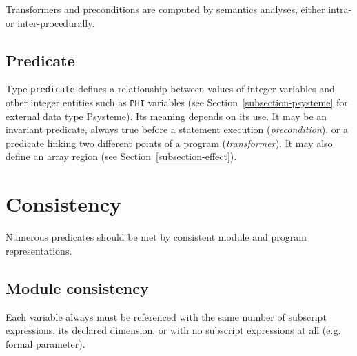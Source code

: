 \documentclass[a4paper]{article}
\begin{document}
Transformers and preconditions are computed by semantics analyses,
either intra- or inter-procedurally.

\begin{comment}
Les transformers ne sont d�finis qu'apr�s une phase d'analyse s�mantique.
\end{comment}

\subsection{Predicate}
\label{subsection-predicate}

{}

Type \verb/predicate/ defines a relationship between values of integer
variables and other integer entities such as \verb/PHI/ variables (see
Section~\ref{subsection-psysteme} for external data type Psysteme). Its
meaning depends on its use. It may be an invariant predicate, always
true before a statement execution (\emph{precondition}), or a predicate
linking two different points of a program (\emph{transformer}). It may
also define an array region (see Section~\ref{subsection-effect}).

\begin{comment}
Le domaine \texttt{predicate} d�finit une relation entre valeurs de
variables scalaires enti�res. Son interpr�tation est fonction de
son utilisation. Il peut s'agir soit d'un pr�dicat valable en
un point du programme (i.e. un invariant), soit d'un pr�dicat
valable entre deux points du programme. Il s'agit alors d'une
abstraction d'une commande, c'est-�-dire d'un \texttt{transformer}.
\end{comment}



\section{Consistency}

Numerous predicates should be met by consistent module and program
representations. 

\subsection{Module consistency}

Each variable always must be referenced with the same number of subscript
expressions, its declared dimension, or with no subscript expressions at
all (e.g. formal parameter).
\end{document}
